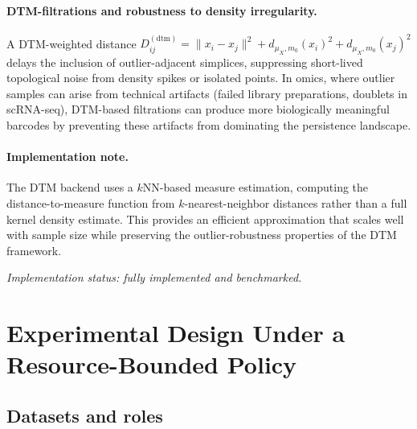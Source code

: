 \documentclass[11pt]{article}
\begin{document}
\paragraph{DTM-filtrations and robustness to density irregularity.}
A DTM-weighted distance $D^{(\text{dtm})}_{ij} = \|x_i - x_j\|^2 + d_{\mu_X, m_0}(x_i)^2 + d_{\mu_X, m_0}(x_j)^2$ delays the inclusion of outlier-adjacent simplices, suppressing short-lived topological noise from density spikes or isolated points.
In omics, where outlier samples can arise from technical artifacts (failed library preparations, doublets in scRNA-seq), DTM-based filtrations can produce more biologically meaningful barcodes by preventing these artifacts from dominating the persistence landscape.

\paragraph{Implementation note.}
The DTM backend uses a $k$NN-based measure estimation, computing the distance-to-measure function from $k$-nearest-neighbor distances rather than a full kernel density estimate.
This provides an efficient approximation that scales well with sample size while preserving the outlier-robustness properties of the DTM framework.

\emph{Implementation status: fully implemented and benchmarked.}

\section{Experimental Design Under a Resource-Bounded Policy}
\label{sec:experimental}

\subsection{Datasets and roles}
\end{document}
